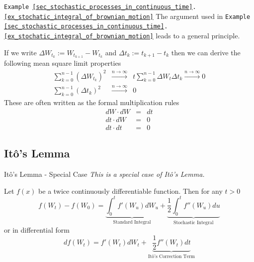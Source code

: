 \documentclass[11pt,a4paper]{article}
\begin{document}
    \begin{remark}{\texttt{Example \ref{sec_stochastic_processes_in_continuous_time}.\ref{ex_stochatic_integral_of_brownian_motion}}}
      The argument used in \texttt{Example \ref{sec_stochastic_processes_in_continuous_time}.\ref{ex_stochatic_integral_of_brownian_motion}} leads to a general principle.
      \par If we write $\Delta W_{t_k}:=W_{t_{k+1}}-W_{t_k}$ and $\Delta t_k:=t_{k+1}-t_k$ then we can derive the following mean square limit properties
      \[\begin{array}{rcl}
        \sum_{k=0}^{n-1}(\Delta W_{t_k})^2&\overset{n\to\infty}{\longrightarrow}&t\sum_{k=0}^{n-1}\Delta W_t\Delta t_k\overset{n\to\infty}{\longrightarrow}0\\
        \sum_{k=0}^{n-1}(\Delta t_k)^2&\overset{n\to\infty}{\longrightarrow}&0
      \end{array}\]
      These are often written as the formal multiplication rules
      \[\begin{array}{rcl}
        dW\cdot dW&=&dt\\
        dt\cdot dW&=&0\\
        dt\cdot dt&=&0
      \end{array}\]
    \end{remark}

\subsection{It\^o's Lemma}

  \begin{theorem}{It\^o's Lemma - Special Case}\label{the_ito_v1}
    \textit{This is a special case of It\^o's Lemma.}
    \par Let $f(x)$ be a twice continuously differentiable function. Then for any $t>0$
    \[ f(W_t)-f(W_0)=\underbrace{\int_0^tf'(W_u)dW_u}_\text{Standard Integral}+\underbrace{\frac12\int_0^tf''(W_u)du}_\text{Stochastic Integral} \]
    or in differential form
    \[ df(W_t)=f'(W_t)dW_t+\underbrace{\frac12f''(W_t)dt}_\text{It\^o's Correction Term} \]
  \end{theorem}
\end{document}
